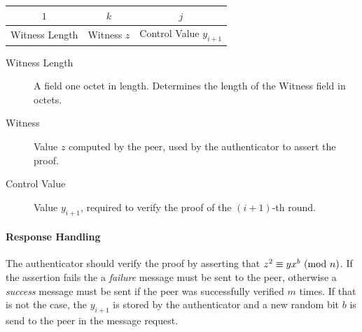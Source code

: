 \begin{center}
\begin{tabular}{|c|c|c|}
	\hline
	$1$ & $k $ & $j$\\
	\hline
	Witness Length & Witness $z$ & Control Value $y_{i+1}$\\ %
	\hline
\end{tabular}
\end{center}

\begin{description}
	\item [Witness Length] A field one octet in length. Determines the length of the Witness field in octets.
	\item [Witness] Value $z$ computed by the peer, used by the authenticator to assert the proof.
	\item [Control Value] Value $y_{i+1}$, required to verify the proof of the $(i+1)$-th round.
\end{description}

\paragraph{Response Handling}
The authenticator should verify the proof by asserting that $z^2 \equiv yx^b \ (\mathrm{mod}\ n)$.
If the assertion fails the a \textit{failure} message must be sent to the peer, otherwise a \textit{success} message must be sent if the peer was successfully verified $m$ times.
If that is not the case, the $y_{i+1}$ is stored by the authenticator and a new random bit $b$ is send to the peer in the message request.

